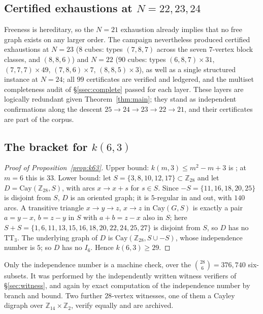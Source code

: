 \documentclass[11pt]{amsart}
\newcommand{\TT}[1]{\mathrm{TT}_{#1}}
\newcommand{\I}[1]{I_{#1}}
\theoremstyle{plain}
\theoremstyle{definition}
\theoremstyle{remark}
\begin{document}
\subsection{Certified exhaustions at $N=22,23,24$}\label{ssec:redundant}
Freeness is hereditary, so the $N=21$ exhaustion already implies that
no free graph exists on any larger order. The campaign nevertheless
produced certified exhaustions at
$N=23$ ($8$ cubes: types $(7,8,7)$ across the seven $7$-vertex block
classes, and $(8,8,6)$) and $N=22$ ($90$ cubes: types
$(6,8,7){\times}31$, $(7,7,7){\times}49$, $(7,8,6){\times}7$,
$(8,8,5){\times}3$), as well as a single structured instance at $N=24$;
all $99$ certificates are verified and ledgered, and the multiset
completeness audit of \S\ref{ssec:complete} passed for each layer.
These layers are logically redundant given Theorem~\ref{thm:main}; they
stand as independent confirmations along the descent
$25\to 24\to 23\to 22\to 21$, and their certificates are part of the
corpus.

\subsection{The bracket for $k(6,3)$}\label{ssec:k63}

\begin{proof}[Proof of Proposition~\ref{prop:k63}]
Upper bound: $k(m,3)\le m^2-m+3$ is \cite[Proposition~3.4]{IRW21};
at $m=6$ this is $33$. Lower bound: let $S=\{3,8,10,12,17\}\subset
\mathbb{Z}_{28}$ and let $D=\mathrm{Cay}(\mathbb{Z}_{28},S)$, with arcs
$x\to x+s$ for $s\in S$. Since $-S=\{11,16,18,20,25\}$ is disjoint from
$S$, $D$ is an oriented graph; it is $5$-regular in and out, with $140$
arcs. A transitive triangle $x\to y\to z$, $x\to z$ in
$\mathrm{Cay}(G,S)$ is exactly a pair $a=y-x$, $b=z-y$ in $S$ with
$a+b=z-x$ also in $S$; here
$S+S=\{1,6,11,13,15,16,18,20,22,24,25,27\}$ is
disjoint from $S$, so $D$ has no $\TT{3}$. The underlying graph of $D$
is $\mathrm{Cay}(\mathbb{Z}_{28},S\cup-S)$, whose independence number is
$5$; so $D$ has no $\I6$. Hence $k(6,3)\ge 29$.
\end{proof}

Only the independence number is a machine check, over the
$\binom{28}{6}=376{,}740$ six-subsets. It was performed by the
independently written witness verifiers of \S\ref{sec:witness}, and
again by exact computation of the independence number by branch and
bound. Two further $28$-vertex
witnesses, one of them a Cayley digraph over
$\mathbb{Z}_{14}\times\mathbb{Z}_2$, verify equally and are archived.
\end{document}
